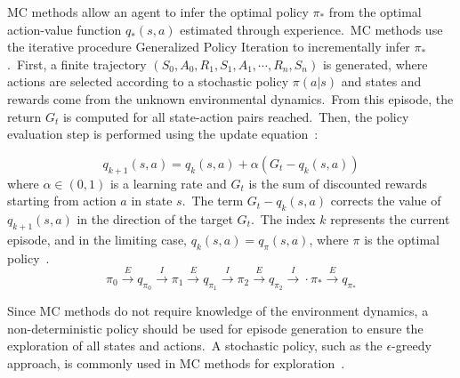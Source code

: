 \documentclass[../xlapes02]{subfiles}
\begin{document}
    MC methods allow an agent to infer the optimal policy $\pi_*$ from the optimal action-value function $q_*(s,a)$ estimated through experience.\ MC methods use the iterative procedure Generalized Policy Iteration to incrementally infer $\pi_*$.\ First, a finite trajectory $(S_0,A_0,R_1,S_1,A_1,\cdots,R_n,S_n)$ is generated, where actions are selected according to a stochastic policy $\pi(a|s)$ and states and rewards come from the unknown environmental dynamics.\ From this episode, the return $G_t$ is computed for all state-action pairs reached.\ Then, the policy evaluation step is performed using the update equation~\cite{sutton2018reinforcement, FITMT25127, rao2022foundations}:


    \begin{equation}
        \label{eq:mc-update}
        q_{k+1}(s,a)=q_k(s,a)+\alpha(G_t-q_k(s,a))
    \end{equation}
    where $\alpha \in (0,1)$ is a learning rate and $G_t$ is the sum of discounted rewards starting from action $a$ in state $s$.\ The term $G_t - q_k(s, a)$ corrects the value of $q_{k+1}(s,a)$ in the direction of the target $G_t$.\ The index $k$ represents the current episode, and in the limiting case, $q_k(s,a) = q_{\pi}(s,a)$, where $\pi$ is the optimal policy~\cite{sutton2018reinforcement}.
    \begin{equation}
        \label{eq:mc-update-2}
        \pi_0\xrightarrow{E}q_{\pi_0}\xrightarrow{I}
        \pi_1\xrightarrow{E}q_{\pi_1}\xrightarrow{I}
        \pi_2\xrightarrow{E}q_{\pi_2}\xrightarrow{I}
        \cdot
        \pi_*\xrightarrow{E}q_{\pi_*}
    \end{equation}

    Since MC methods do not require knowledge of the environment dynamics, a non-deterministic policy should be used for episode generation to ensure the exploration of all states and actions.\ A stochastic policy, such as the $\epsilon$-greedy approach, is commonly used in MC methods for exploration~\cite{FITMT25127}.
\end{document}
